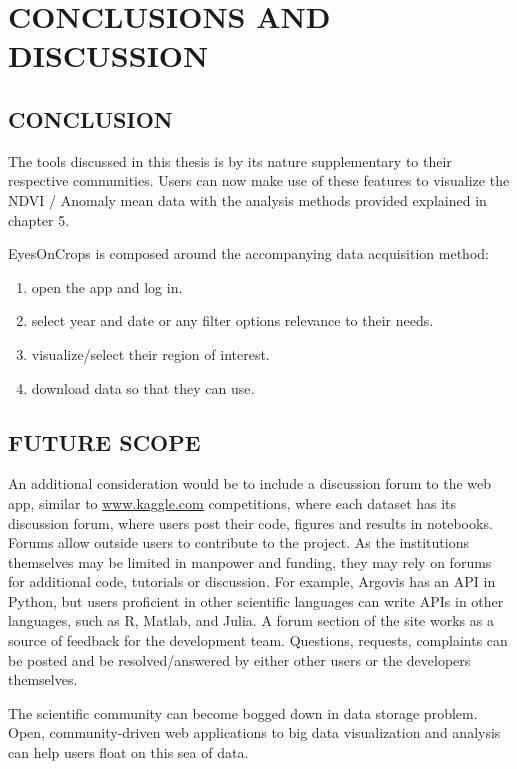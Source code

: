 \chapter{CONCLUSIONS AND DISCUSSION}
\label{chap:conclusion}

\section{CONCLUSION}

The tools discussed in this thesis is by its nature supplementary to their respective communities. Users can now make use of these features to visualize the NDVI / Anomaly mean data with the analysis methods provided explained in chapter 5. 

EyesOnCrops is composed around the accompanying data acquisition method:
\begin{enumerate}
  \item open the app and log in. 
  \item select year and date or any filter options relevance to their needs.
  \item visualize/select their region of interest.
  \item download data so that they can use.
\end{enumerate}


\section{FUTURE SCOPE}


An additional consideration would be to include a discussion forum to the web app, similar to \url{www.kaggle.com} \cite{kaggle} competitions, where each dataset has its discussion forum, where users post their code, figures and results in notebooks. Forums allow outside users to contribute to the project. As the institutions themselves may be limited in manpower and funding, they may rely on forums for additional code, tutorials or discussion. For example, Argovis has an API in Python, but users proficient in other scientific languages can write APIs in other languages, such as R, Matlab, and Julia. A forum section of the site works as a source of feedback for the development team. Questions, requests, complaints can be posted and be resolved/answered by either other users or the developers themselves.

The scientific community can become bogged down in data storage problem. Open, community-driven web applications to big data visualization and analysis can help users float on this sea of data.